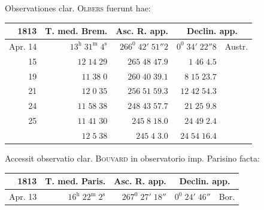 Observationes clar. \textsc{Olbers} fuerunt hae:
\begin{center}\small\setlength{\tabcolsep}{4pt}
\begin{tabular}{r|r|r|r l}
1813&T. med. Brem.&Asc. R. app.&\multicolumn{2}{c}{Declin. app.}\\\hline
Apr. 14&$13^{\mathrm h}\;31^{\mathrm m}\;4^{\mathrm s}$&$266^0\;42'\;51''2$&$0^0\;34'\;22''8$&Austr.\\
15&$12\;14\;29$&$265\;48\;47.9$&$1\;46\;4.5$&\\
19&$11\;38\;0$&$260\;40\;39.1$&$8\;15\;23.7$&\\
21&$12\;0\;35$&$256\;51\;59.3$&$12\;42\;54.3$&\\
24&$11\;58\;38$&$248\;43\;57.7$&$21\;25\;9.8$&\\
25&$11\;41\;30$&$245\;8\;18.0$&$24\;49\;2.4$&\\
&$12\;5\;38$&$245\;4\;3.0$&$24\;54\;16.4$&
\end{tabular}\end{center}

Accessit observatio clar. \textsc{Bouvard} in observatorio imp. Parisino facta:
\begin{center}\small\setlength{\tabcolsep}{4pt}
\begin{tabular}{r|r|r|r l}
1813&T. med. Paris.&Asc. R. app.&\multicolumn{2}{c}{Declin. app.}\\\hline
Apr. 13&$16^{\mathrm h}\;22^{\mathrm m}\;2^{\mathrm s}$&$267^0\;27'\;18''$&$0^0\;24'\;46''$&Bor.
\end{tabular}\end{center}

